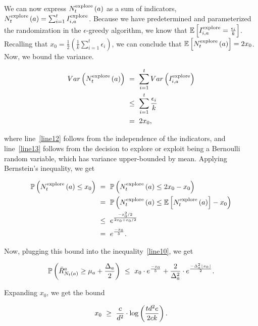 \documentclass[11pt]{article}
\begin{document}
\noindent We can now express $N_t^{\textnormal{explore}} \left( a \right)$ as a sum of indicators, $N_t^{\textnormal{explore}} \left( a \right) = \sum_{i=1}^t I_{i,a}^{\textnormal{explore}}$. Because we have predetermined and parameterized the randomization in the $\epsilon$-greedy algorithm, we know that $\mathbb{E}\left[ I_{i,a}^{\textnormal{explore}} = \frac{\epsilon_i}{k} \right]$. Recalling that $x_0 = \frac{1}{2} \left( \frac{1}{k} \sum_{i=1}^t \epsilon_i \right)$, we can conclude that $\mathbb{E}\left[ N_t^{\textnormal{explore}} \left( a \right) \right] = 2 x_0$. Now, we bound the variance.

\begin{align}
Var \left( N_t^{\textnormal{explore}} \left( a \right) \right)\ &=\ \sum_{i=1}^t Var \left( I_{i,a}^{\textnormal{explore}} \right) \label{line12}\\
&\leq\ \sum_{i=1}^t \frac{\epsilon_i}{k} \label{line13}\\
&=\ 2 x_0 \textnormal{,}
\end{align}

\noindent where line~\ref{line12} follows from the independence of the indicators, and line~\ref{line13} follows from the decision to explore or exploit being a Bernoulli random variable, which has variance upper-bounded by mean. Applying Bernstein's inequality, we get

\begin{align}
	\prob{N_t^{\textnormal{explore}} \left( a \right) \leq x_0}\ &=\ \prob{N_t^{\textnormal{explore}} \left( a \right) \leq 2x_0 - x_0}\\
	&=\ \prob{N_t^{\textnormal{explore}} \left( a \right) \leq \E{N_t^{\textnormal{explore}} \left( a \right)} - x_0}\\
	&\leq\ e^{\frac{-x_0^2 / 2}{2x_0 + x_0 / 2}}\\
	&=\ e^{\frac{-x_0}{5}} \textnormal{.}
\end{align}

\noindent Now, plugging this bound into the inequality~\ref{line10}, we get

\begin{align}
	\mathbb{P}\left( \bar{R}^a_{N_t \left( a \right)} \geq \mu_a + \frac{\Delta_a}{2} \right)\ \leq\ x_0 \cdot e^{\frac{-x_0}{5}} + \frac{2}{\Delta_a^2} \cdot e^{\frac{-\Delta_a^2 \lfloor x_0 \rfloor}{2}} \textnormal{.} \label{line19}
\end{align}

\noindent Expanding $x_0$, we get the bound

\begin{align}
	x_0\ \geq\ \frac{c}{d^2} \cdot \log \left( \frac{td^2e}{2ck} \right) \textnormal{.} \label{line20}
\end{align}
\end{document}
